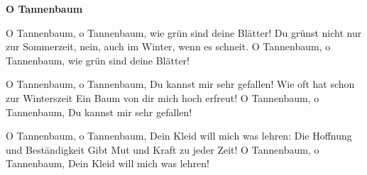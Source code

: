 \documentclass[10pt]{article}
\begin{document}
{\Large
\begin{guitar}
    \textbf{O Tannenbaum}


    O Tannenbaum, o Tannenbaum,
    wie grün sind deine Blätter!
    Du grünst nicht nur zur Sommerzeit,
    nein, auch im Winter, wenn es schneit.
    O Tannenbaum, o Tannenbaum,
    wie grün sind deine Blätter!


    O Tannenbaum, o Tannenbaum,
    Du kannst mir sehr gefallen!
    Wie oft hat schon zur Winterszeit
    Ein Baum von dir mich hoch erfreut!
    O Tannenbaum, o Tannenbaum,
    Du kannst mir sehr gefallen!


    O Tannenbaum, o Tannenbaum,
    Dein Kleid will mich was lehren:
    Die Hoffnung und Beständigkeit
    Gibt Mut und Kraft zu jeder Zeit!
    O Tannenbaum, o Tannenbaum,
    Dein Kleid will mich was lehren!
\end{guitar}
}
\end{document}
